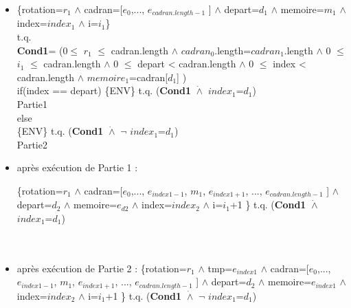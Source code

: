 \documentclass[a4paper, 12pt]{article}
\begin{document}
\begin{itemize}


\item \{rotation=$r_{1}$ $\wedge$ cadran=[$e_{0}$,..., $e_{cadran.length-1}$ ] $\wedge$ depart=$d_{1}$ $\wedge$ memoire=$m_{1}$ $\wedge$ index=$index_{1}$ $\wedge$ i=$i_{1}$\}\\
t.q.\\
\textbf{Cond1}=
(0$\le$ $r_{1}$ $\le$ cadran.length $\wedge$ $cadran_{0}$.length=$cadran_{1}$.length  $\wedge$ 0 $\le$ $i_{1}$ $\le$ cadran.length $\wedge$ 0 $\le$ depart < cadran.length $\wedge$ 0 $\le$ index < cadran.length $\wedge$   $memoire_{1}$=cadran[$d_{1}$] )\\

if(index == depart) 
 \{ENV\} t.q. (\textbf{Cond1} $\dot{\wedge}$ $index_{1}$=$d_{1}$)\\
 Partie1\\
else\\
 \{ENV\} t.q. (\textbf{Cond1} $\dot{\wedge}$ $\neg$ $index_{1}$=$d_{1}$)\\
 Partie2\\
 
\item après exécution de Partie 1 : 

\{rotation=$r_{1}$ $\wedge$ cadran=[$e_{0}$,..., $e_{index1-1}$, $m_{1}$, $e_{index1+1}$, ...,  $e_{cadran.length-1}$ ] $\wedge$ depart=$d_{2}$ $\wedge$ memoire=$e_{d2}$ $\wedge$ index=$index_{2}$ $\wedge$ i=$i_{1}$+1 \} t.q. (\textbf{Cond1} $\dot{\wedge}$ $index_{1}$=$d_{1}$)\\
\\
\\
\item après exécution de Partie 2 : 
\{rotation=$r_{1}$ $\wedge$  tmp=$e_{index1}$ $\wedge$ cadran=[$e_{0}$,..., $e_{index1-1}$, $m_{1}$, $e_{index1+1}$, ...,  $e_{cadran.length-1}$ ] $\wedge$ depart=$d_{2}$ $\wedge$ memoire=$e_{index1}$ $\wedge$ index=$index_{2}$ $\wedge$ i=$i_{1}$+1 \} t.q. (\textbf{Cond1} $\dot{\wedge}$ $\neg$ $index_{1}$=$d_{1}$)\\




\end{itemize}
\end{document}
